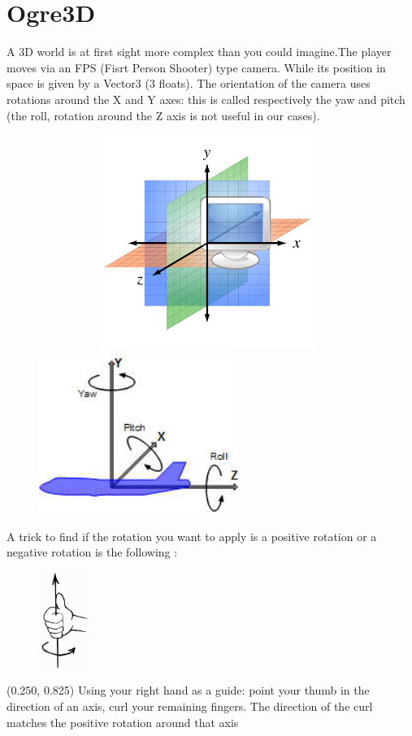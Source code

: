 \documentclass[article]{report} %
\begin{document}
			\section{Ogre3D}
				A 3D world is at first sight more complex than you could imagine.The player moves via an FPS (Fisrt Person Shooter) type camera. While its position in space is given by a Vector3 (3 floats). The orientation of the camera uses rotations around the X and Y axes: this is called respectively the yaw and pitch (the roll, rotation around the Z axis is not useful in our cases).
			\begin{figure}[h]
				\includegraphics[width=11cm,   height=7cm]{images/Schemas/axis.png}
				\includegraphics[width=6.5cm]{images/Schemas/Rotations.jpeg}
			\end{figure}
			
			A trick to find if the rotation you want to apply is a positive rotation or a negative rotation is the following : \\
			\begin{figure}[h]
				\includegraphics[]{images/Schemas/RotationsPositive.png}
			\end{figure}
			\begin{textblock}{0.628}(0.250, 0.825)
							\noindent  Using your right hand as a guide: point your thumb in the direction of an axis, curl your remaining fingers. The direction of the curl matches the positive rotation around that axis
			\end{textblock}
\end{document}
